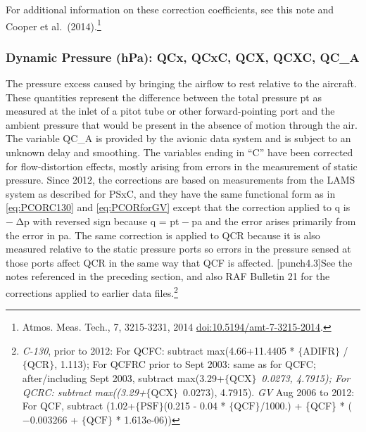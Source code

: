 \documentclass[
  english,
]{book}
\begin{document}
For additional information on these correction coefficients, see this note and Cooper et al.~(2014).\footnote{Atmos. Meas. Tech., 7, 3215-3231, 2014 \url{doi:10.5194/amt-7-3215-2014}.}

\hypertarget{qcx}{%
\subsubsection*{Dynamic Pressure (hPa): QCx, QCxC, QCX, QCXC, QC\_A}\label{qcx}}

The pressure excess caused by bringing the airflow to rest relative to the aircraft. These quantities represent the difference between the total pressure {pt} as measured at the inlet of a pitot tube or other forward-pointing port and the ambient pressure that would be present in the absence of motion through the air. The variable QC\_A is provided by the avionic data system and is subject to an unknown delay and smoothing. The variables ending in ``C'' have been corrected for flow-distortion effects, mostly arising from errors in the measurement of static pressure. Since 2012, the corrections are based on measurements from the LAMS system as described for PSxC, and they have the same functional form as in \eqref{eq:PCORC130} and
\eqref{eq:PCORforGV} except that the correction applied to {q} is { − Δp} with reversed sign because {q = pt − pa} and the error arises primarily from the error in {pa}. The same correction is applied to QCR because it is also measured relative to the static pressure ports so errors in the pressure sensed at those ports affect QCR in the same way that QCF is affected. \protect\hypertarget{punch4.3}{}{{[}punch4.3{]}}See the notes referenced in the preceding section, and also RAF Bulletin 21 for the corrections applied to earlier data files.\footnote{\emph{C-130}, prior to 2012: For QCFC: subtract max(4.66+11.4405 * \(\mathrm{\{ADIFR\}}\) / \(\mathrm{\{QCR\}}\), 1.113); For QCFRC prior to Sept 2003: same as for QCFC; after/including Sept 2003, subtract max(3.29+\(\mathrm{\{QCX\}}\) \emph{ 0.0273, 4.7915); For QCRC: subtract max((3.29+\(\mathrm{\{QCX\}}\) } 0.0273), 4.7915). \emph{GV} Aug 2006 to 2012: For QCF, subtract (1.02+\(\mathrm{\{PSF\}}\)(0.215 - 0.04 * \(\mathrm{\{QCF\}}\)/1000.) + \{QCF\} * (\(-0.003266\) + \(\mathrm{\{QCF\}}\) * 1.613e-06))
}
\end{document}
